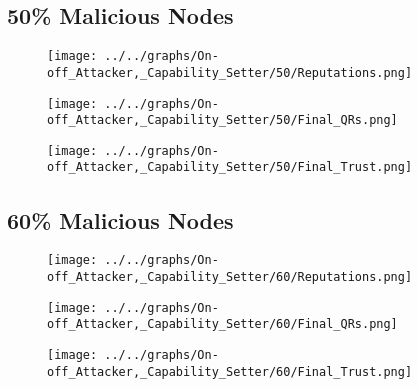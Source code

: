 \begin{minipage}[t]{0.49\columnwidth}
\subsection*{50\% Malicious Nodes}
    \begin{figure}[H]
        \centering
        \texttt{[image: ../../graphs/On-off\_Attacker,\_Capability\_Setter/50/Reputations.png]}
    \end{figure}
    \begin{figure}[H]
        \centering
        \texttt{[image: ../../graphs/On-off\_Attacker,\_Capability\_Setter/50/Final\_QRs.png]}
    \end{figure}
\end{minipage}
\begin{minipage}[t]{0.49\columnwidth}
    \begin{figure}[H]
        \centering
        \texttt{[image: ../../graphs/On-off\_Attacker,\_Capability\_Setter/50/Final\_Trust.png]}
    \end{figure}
\end{minipage}

\begin{minipage}[t]{0.49\columnwidth}
\subsection*{60\% Malicious Nodes}
    \begin{figure}[H]
        \centering
        \texttt{[image: ../../graphs/On-off\_Attacker,\_Capability\_Setter/60/Reputations.png]}
    \end{figure}
    \begin{figure}[H]
        \centering
        \texttt{[image: ../../graphs/On-off\_Attacker,\_Capability\_Setter/60/Final\_QRs.png]}
    \end{figure}
\end{minipage}
\begin{minipage}[t]{0.49\columnwidth}
    \begin{figure}[H]
        \centering
        \texttt{[image: ../../graphs/On-off\_Attacker,\_Capability\_Setter/60/Final\_Trust.png]}
    \end{figure}
\end{minipage}

